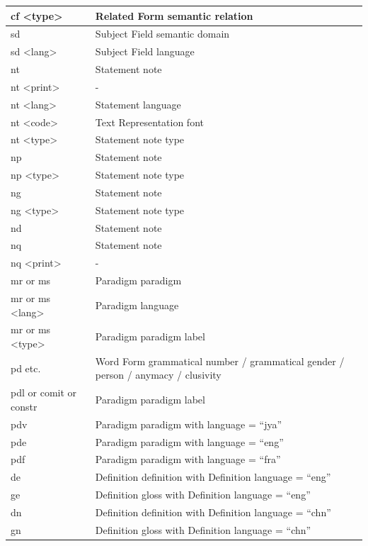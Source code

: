 \documentclass[a4paper,12pt]{article}
\begin{document}
\begin{center}
\begin{longtable}{|p{4cm}|p{11cm}|}
cf \textless type\textgreater & Related Form semantic relation \\ \hline
sd & Subject Field semantic domain \\ \hline
sd \textless lang\textgreater & Subject Field language \\ \hline
nt & Statement note \\ \hline
nt \textless print\textgreater & - \\ \hline
nt \textless lang\textgreater & Statement language \\ \hline
nt \textless code\textgreater & Text Representation font \\ \hline
nt \textless type\textgreater & Statement note type \\ \hline
np & Statement note \\ \hline
np \textless type\textgreater & Statement note type \\ \hline
ng & Statement note \\ \hline
ng \textless type\textgreater & Statement note type \\ \hline
nd & Statement note \\ \hline
nq & Statement note \\ \hline
nq \textless print\textgreater & - \\ \hline
mr or ms & Paradigm paradigm \\ \hline
mr or ms \textless lang\textgreater & Paradigm language \\ \hline
mr or ms \textless type\textgreater & Paradigm paradigm label \\ \hline
pd etc. & Word Form grammatical number / grammatical gender / person / anymacy / clusivity \\ \hline
pdl or comit or constr & Paradigm paradigm label \\ \hline
pdv & Paradigm paradigm with language = ``jya'' \\ \hline
pde & Paradigm paradigm with language = ``eng'' \\ \hline
pdf & Paradigm paradigm with language = ``fra'' \\ \hline
de & Definition definition with Definition language = ``eng'' \\ \hline
ge & Definition gloss with Definition language = ``eng'' \\ \hline
dn & Definition definition with Definition language = ``chn'' \\ \hline
gn & Definition gloss with Definition language = ``chn'' \\ \hline

\end{longtable}
\end{center}
\end{document}
